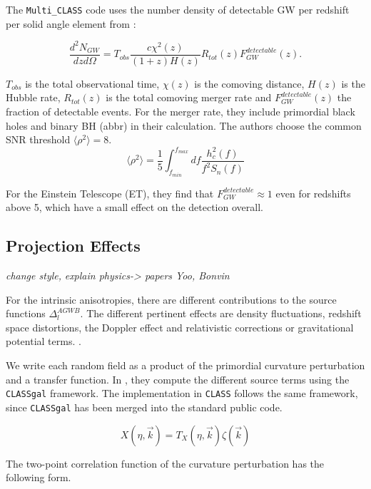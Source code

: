 The {\tt Multi\_CLASS} code uses the number density of detectable GW per redshift per solid angle element from \cite{scelfo_gwtimeslss_2018}:

\begin{equation}
    \frac{d^2N_{GW}}{dzd\Omega} = T_{obs}\frac{c\chi^2(z)}{(1+z)H(z)}R_{tot}(z)F_{GW}^{detectable}(z).
\end{equation}

$T_{obs}$ is the total observational time, $\chi(z)$ is the comoving distance, $H(z)$ is the Hubble rate, $R_{tot}(z)$ is the total comoving merger rate and $F_{GW}^{detectable}(z)$ the fraction of detectable events. For the merger rate, they include primordial black holes and binary BH (abbr) in their calculation.
The authors choose the common SNR threshold $\langle \rho^2 \rangle =8$.
\begin{equation}
    \langle \rho^2 \rangle = \frac{1}{5}\int_{f_{min}}^{f_{max}} df \frac{h_c^2(f)}{f^2 S_n(f)}
\end{equation}

For the Einstein Telescope (ET), they find that $F_{GW}^{detectable} \approx 1$ even for redshifts above 5, which have a small effect on the detection overall.

\subsection{Projection Effects}

\textit{change style,}
\textit{explain physics-> papers Yoo, Bonvin}

For the intrinsic anisotropies, there are different contributions to the source functions $\Delta_l^{AGWB}$. The different pertinent effects are density fluctuations, redshift space distortions, the Doppler effect and relativistic corrections or gravitational potential terms. \cite{di_dio_classgal_2013}.

We write each random field as a product of the primordial curvature perturbation and a transfer function. In \cite{dallarmi_dipole_2022}, they compute the different source terms using the {\tt CLASSgal} framework. The implementation in {\tt CLASS} follows the same framework, since {\tt CLASSgal} has been merged into the standard public code.

\begin{equation}
    X(\eta, \vec{k}) = T_X(\eta, \vec{k})\zeta(\vec{k})
\end{equation}

The two-point correlation function of the curvature perturbation has the following form.

